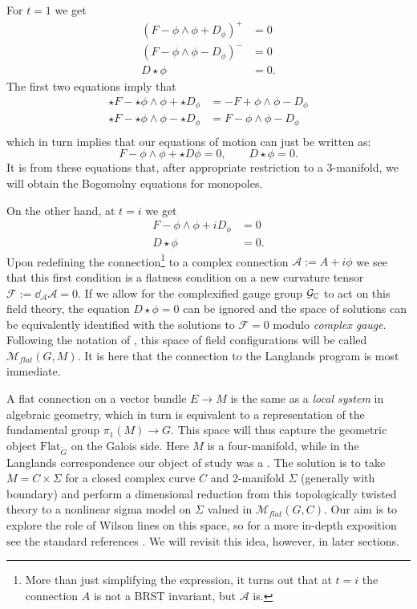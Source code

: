 	For $t = 1$ we get
	\[
	\begin{aligned}
		(F - \phi \wedge \phi + D_\phi)^+ &= 0\\
		(F - \phi \wedge \phi - D_\phi)^- &= 0\\
		D \star \phi &= 0.
	\end{aligned}	
	\]
	The first  two equations imply that
	\[
	\begin{aligned}
		\star F - \star \phi \wedge \phi + \star D_\phi &= - F + \phi \wedge \phi - D_\phi\\
		\star F - \star \phi \wedge \phi - \star D_\phi &= F - \phi \wedge \phi - D_\phi\\
	\end{aligned}		
	\]
	which in turn implies that our equations of motion can just be written as:
	\begin{equation}
		F - \phi \wedge \phi + \star D \phi = 0, \qquad D \star \phi = 0.
	\end{equation}
	It is from these equations that, after appropriate restriction to a 3-manifold, we will obtain the Bogomolny equations for monopoles.
	
	
	On the other hand, at $t=i$ we get
	\[
	\begin{aligned}
		F - \phi \wedge \phi + i D_\phi &= 0\\
		D \star \phi &= 0.
	\end{aligned}	
	\]
	Upon redefining the connection\footnote{More than just simplifying the expression, it turns out that at $t=i$ the connection $A$ is not a BRST invariant, but $\mathcal A$ is.} to a complex connection $\mathcal A := A + i \phi$ we see that this first condition is a flatness condition on a new curvature tensor $\mathcal F := \dd_{\mathcal A} \mathcal A = 0$.  If we allow for the complexified gauge group $\mathcal G_{\mathbb{C}}$ to act on this field theory, the equation $D \star \phi = 0$ can be ignored and the space of solutions can be equivalently identified with the solutions to $\mathcal F = 0$ modulo \emph{complex gauge}. Following the notation of \cite{kapustin2008}, this space of field configurations will be called $\mathcal M_{flat}(G, M)$. It is here that the connection to the Langlands program is most immediate.
	
	A flat connection on a vector bundle $E \to M$ is the same as a \emph{local system} in algebraic geometry, which in turn is equivalent to a representation of the fundamental group $\pi_1(M) \to G$.
	 This space will thus capture the geometric object $\mathrm{Flat}_{\check G}$ on the Galois side. Here $M$ is a four-manifold, while in the Langlands correspondence our object of study was a . The solution is to take $M = C \times \Sigma$ for a closed complex curve $C$ and 2-manifold $\Sigma$ (generally with boundary) and perform a dimensional reduction from this topologically twisted theory to a nonlinear sigma model on $\Sigma$ valued in $\mathcal M_{flat}(G, C)$.
	 Our aim is to explore the role of Wilson lines on this space, so for a more in-depth exposition see the standard references \cite{kapustin2006, kapustin2008}. We will revisit this idea, however, in later sections. 
	
